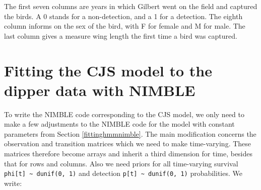 \documentclass[
  12pt,
]{krantz}
\begin{document}
The first seven columns are years in which Gilbert went on the field and captured the birds. A 0 stands for a non-detection, and a 1 for a detection. The eighth column informs on the sex of the bird, with F for female and M for male. The last column gives a measure wing length the first time a bird was captured.

\section{Fitting the CJS model to the dipper data with NIMBLE}\label{fitting-the-cjs-model-to-the-dipper-data-with-nimble}

To write the NIMBLE code corresponding to the CJS model, we only need to make a few adjustments to the NIMBLE code for the model with constant parameters from Section \ref{fittinghmmnimble}. The main modification concerns the observation and transition matrices which we need to make time-varying. These matrices therefore become arrays and inherit a third dimension for time, besides that for rows and columns. Also we need priors for all time-varying survival \texttt{phi{[}t{]}\ \textasciitilde{}\ dunif(0,\ 1)} and detection \texttt{p{[}t{]}\ \textasciitilde{}\ dunif(0,\ 1)} probabilities. We write:
\end{document}
